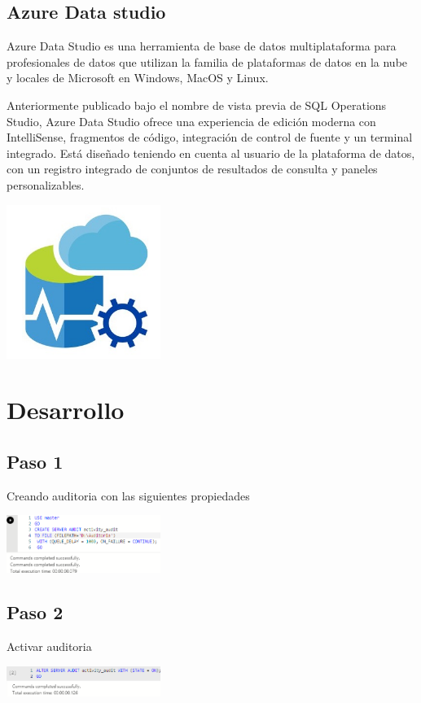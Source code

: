 \documentclass[twoside,twocolumn]{article}
\begin{document}
\subsection{Azure Data studio}
Azure Data Studio es una herramienta de base de datos multiplataforma para profesionales de datos que utilizan la familia de plataformas de datos en la nube y locales de Microsoft en Windows, MacOS y Linux.

Anteriormente publicado bajo el nombre de vista previa de SQL Operations Studio, Azure Data Studio ofrece una experiencia de edición moderna con IntelliSense, fragmentos de código, integración de control de fuente y un terminal integrado. Está diseñado teniendo en cuenta al usuario de la plataforma de datos, con un registro integrado de conjuntos de resultados de consulta y paneles personalizables.

\begin{center}
	\includegraphics[width=5cm]{./Imagenes/azure} 
\end{center}


\section{Desarrollo}

\subsection{Paso 1}
Creando auditoria con las siguientes propiedades
\begin{center}
	\includegraphics[width=5cm]{./Imagenes/1} 
\end{center}
\subsection{Paso 2}
Activar auditoria
\begin{center}
	\includegraphics[width=5cm]{./Imagenes/2} 
\end{center}
\end{document}

